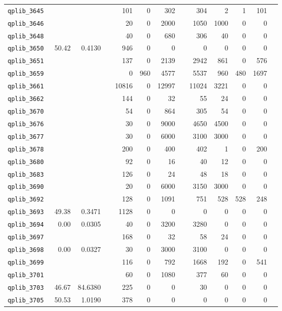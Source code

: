 \begin{longtable}{lrrrrrrrrrrrr}
{\tt 	qplib\_3645	}	&		&		&	&	101	&	0	&	302	&	&	304	&	2	&	1	&	101	\\
{\tt 	qplib\_3646	}	&		&		&	&	20	&	0	&	2000	&	&	1050	&	1000	&	0	&	0	\\
{\tt 	qplib\_3648	}	&		&		&	&	40	&	0	&	680	&	&	306	&	40	&	0	&	0	\\
{\tt 	qplib\_3650	}	&	50.42	&	0.4130	&	&	946	&	0	&	0	&	&	0	&	0	&	0	&	0	\\
{\tt 	qplib\_3651	}	&		&		&	&	137	&	0	&	2139	&	&	2942	&	861	&	0	&	576	\\
{\tt 	qplib\_3659	}	&		&		&	&	0	&	960	&	4577	&	&	5537	&	960	&	480	&	1697	\\
{\tt 	qplib\_3661	}	&		&		&	&	10816	&	0	&	12997	&	&	11024	&	3221	&	0	&	0	\\
{\tt 	qplib\_3662	}	&		&		&	&	144	&	0	&	32	&	&	55	&	24	&	0	&	0	\\
{\tt 	qplib\_3670	}	&		&		&	&	54	&	0	&	864	&	&	305	&	54	&	0	&	0	\\
{\tt 	qplib\_3676	}	&		&		&	&	30	&	0	&	9000	&	&	4650	&	4500	&	0	&	0	\\
{\tt 	qplib\_3677	}	&		&		&	&	30	&	0	&	6000	&	&	3100	&	3000	&	0	&	0	\\
{\tt 	qplib\_3678	}	&		&		&	&	200	&	0	&	400	&	&	402	&	1	&	0	&	200	\\
{\tt 	qplib\_3680	}	&		&		&	&	92	&	0	&	16	&	&	40	&	12	&	0	&	0	\\
{\tt 	qplib\_3683	}	&		&		&	&	126	&	0	&	24	&	&	48	&	18	&	0	&	0	\\
{\tt 	qplib\_3690	}	&		&		&	&	20	&	0	&	6000	&	&	3150	&	3000	&	0	&	0	\\
{\tt 	qplib\_3692	}	&		&		&	&	128	&	0	&	1091	&	&	751	&	528	&	528	&	248	\\
{\tt 	qplib\_3693	}	&	49.38	&	0.3471	&	&	1128	&	0	&	0	&	&	0	&	0	&	0	&	0	\\
{\tt 	qplib\_3694	}	&	0.00	&	0.0305	&	&	40	&	0	&	3200	&	&	3280	&	0	&	0	&	0	\\
{\tt 	qplib\_3697	}	&		&		&	&	168	&	0	&	32	&	&	58	&	24	&	0	&	0	\\
{\tt 	qplib\_3698	}	&	0.00	&	0.0327	&	&	30	&	0	&	3000	&	&	3100	&	0	&	0	&	0	\\
{\tt 	qplib\_3699	}	&		&		&	&	116	&	0	&	792	&	&	1668	&	192	&	0	&	541	\\
{\tt 	qplib\_3701	}	&		&		&	&	60	&	0	&	1080	&	&	377	&	60	&	0	&	0	\\
{\tt 	qplib\_3703	}	&	46.67	&	84.6380	&	&	225	&	0	&	0	&	&	30	&	0	&	0	&	0	\\
{\tt 	qplib\_3705	}	&	50.53	&	1.0190	&	&	378	&	0	&	0	&	&	0	&	0	&	0	&	0	\\

\end{longtable}
